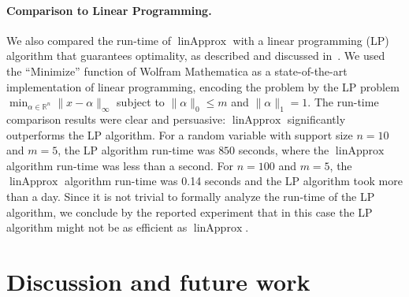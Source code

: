\documentclass[letterpaper]{article} %
\DeclareMathOperator{\KlmApprox}{linApprox}
\begin{document}
\paragraph{Comparison to Linear Programming.}
We also compared the run-time of $\KlmApprox$ with a linear programming (LP) algorithm that guarantees optimality, as described and discussed in~\cite{pavlikov2016cvar}.
We used the ``Minimize'' function of Wolfram Mathematica as a state-of-the-art implementation of linear programming, encoding the problem by the LP problem $\min_{\alpha \in \mathbb{R}^n} \| x - \alpha\|_\infty$ subject to $\|\alpha\|_0 \leq m$ and $\| \alpha \|_1{=}1$.
The run-time comparison results were clear and persuasive: $\KlmApprox$ significantly outperforms the LP algorithm. For a random variable with support size $n{=}10$ and $m=5$, the LP algorithm run-time was $850$ seconds, where the $\KlmApprox$ algorithm run-time was less than a second. For $n{=}100$ and $m{=}5$, the $\KlmApprox$ algorithm run-time was 0.14 seconds and the LP algorithm took more than a day. Since it is not trivial to formally analyze the run-time of the LP algorithm, we conclude by the reported experiment that in this case the LP algorithm might not be as efficient as $\KlmApprox$.

\section{Discussion and future work}\label{sec:discussion}
\end{document}
